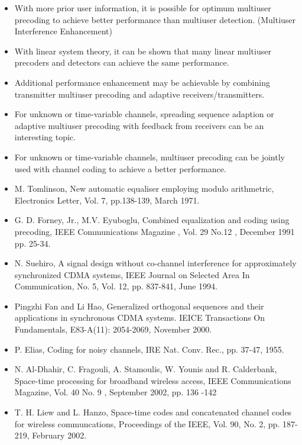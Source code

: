 \documentclass[20pt,landscape]{foils}
\begin{document}
\begin{itemize}
\item With more prior user information, it is possible for optimum
multiuser precoding to achieve better performance than multiuser
detection. (Multiuser Interference Enhancement)

\item With linear system theory, it can be shown that many linear
multiuser precoders and detectors can achieve the same
performance.

\item Additional performance enhancement may be achievable by
combining transmitter multiuser precoding and adaptive
receivers/transmitters.

\item For unknown or time-variable channels, spreading sequence
adaption or adaptive multiuser precoding with feedback from
receivers can be an interesting topic.

\item For unknown or time-variable channels, multiuser precoding
can be jointly used with channel coding to achieve a better
performance.

\end{itemize}

\begin{itemize}\tiny

\item M. Tomlinson, New automatic equaliser employing modulo
arithmetric, Electronics Letter, Vol. 7, pp.138-139, March 1971.

\item G. D. Forney, Jr., M.V. Eyuboglu, Combined equalization and
coding using precoding, IEEE Communications Magazine , Vol. 29
No.12 , December 1991 pp. 25-34.

\item N. Suehiro, A signal design without co-channel interference
for approximately synchronized CDMA systems, IEEE Journal on
Selected Area In Communication, No. 5, Vol. 12, pp. 837-841, June
1994.

\item Pingzhi Fan and Li Hao, Generalized orthogonal sequences and
their applications in synchronous CDMA systems. IEICE Transactions
On Fundamentals, E83-A(11): 2054-2069, November 2000.

\item P. Elias, Coding for noisy channels, IRE Nat. Conv. Rec.,
pp. 37-47, 1955.

\item N. Al-Dhahir, C. Fragouli, A. Stamoulis, W. Younis and R.
Calderbank, Space-time processing for broadband wireless access,
IEEE Communications Magazine, Vol. 40 No. 9 , September 2002, pp.
136 -142

\item T. H. Liew and L. Hanzo, Space-time codes and concatenated
channel codes for wireless communcations, Proceedings of the IEEE,
Vol. 90, No. 2, pp. 187-219, February 2002.

\end{itemize}
\end{document}
